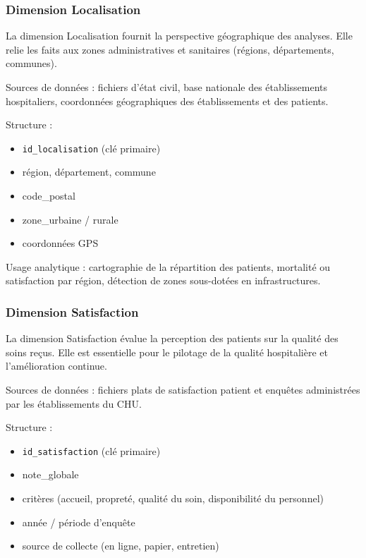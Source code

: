 \documentclass[12pt,a4paper]{article}
\begin{document}
\subsubsection{Dimension Localisation}

La dimension Localisation fournit la perspective géographique des analyses. Elle relie les faits aux zones administratives et sanitaires (régions, départements, communes).

Sources de données : fichiers d’état civil, base nationale des établissements hospitaliers, coordonnées géographiques des établissements et des patients.

Structure :
\begin{itemize}
    \item \texttt{id\_localisation} (clé primaire)
    \item région, département, commune
    \item code\_postal
    \item zone\_urbaine / rurale
    \item coordonnées GPS
\end{itemize}

Usage analytique : cartographie de la répartition des patients, mortalité ou satisfaction par région, détection de zones sous-dotées en infrastructures.

\subsubsection{Dimension Satisfaction}

La dimension Satisfaction évalue la perception des patients sur la qualité des soins reçus. Elle est essentielle pour le pilotage de la qualité hospitalière et l’amélioration continue.

Sources de données : fichiers plats de satisfaction patient et enquêtes administrées par les établissements du CHU.

Structure :
\begin{itemize}
    \item \texttt{id\_satisfaction} (clé primaire)
    \item note\_globale
    \item critères (accueil, propreté, qualité du soin, disponibilité du personnel)
    \item année / période d’enquête
    \item source de collecte (en ligne, papier, entretien)
\end{itemize}
\end{document}
